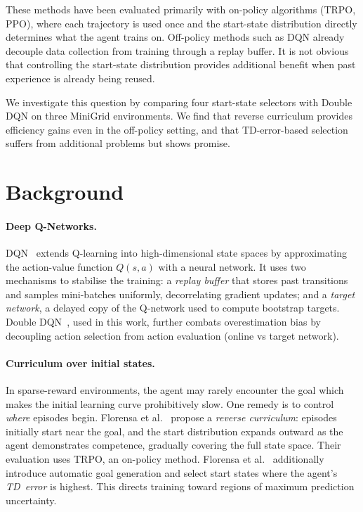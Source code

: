 \documentclass{article}
\begin{document}
These methods have been evaluated primarily with on-policy algorithms
(TRPO, PPO), where each trajectory is used once and the start-state
distribution directly determines what the agent trains on. Off-policy
methods such as DQN already decouple data collection from training through a replay buffer. It is not obvious that controlling the start-state distribution provides additional benefit when past experience is already
being reused.

We investigate this question by comparing four start-state selectors with Double DQN on three MiniGrid environments. We find that reverse curriculum provides efficiency gains even in the off-policy setting,
and that TD-error-based selection suffers from additional problems but shows promise.

\section{Background}
\label{sec:background}

\paragraph{Deep Q-Networks.}
DQN~\cite{mnih2015dqn} extends Q-learning into high-dimensional
state spaces by approximating the action-value function $Q(s,a)$ with a
neural network. It uses two mechanisms to stabilise the training: a \emph{replay buffer} that stores past transitions and samples mini-batches uniformly, decorrelating gradient updates; and a \emph{target network}, a delayed copy of the Q-network used to compute bootstrap targets. Double DQN~\cite{van2016double}, used in this work, further combats overestimation bias by decoupling action selection from action evaluation (online vs target network).

\paragraph{Curriculum over initial states.}
In sparse-reward environments, the agent may rarely encounter the goal which makes the initial learning curve prohibitively slow. One remedy is to control \emph{where} episodes begin. Florensa et al.~\cite{florensa2017reverse} propose a \emph{reverse
curriculum}: episodes initially start near the goal, and the start
distribution expands outward as the agent demonstrates competence,
gradually covering the full state space. Their evaluation uses TRPO, an
on-policy method. Florensa et al.~\cite{florensa2018automatic} additionally introduce automatic goal generation and select start states where the agent's \emph{TD~error} is highest. This directs training toward regions of maximum prediction uncertainty.
\end{document}
